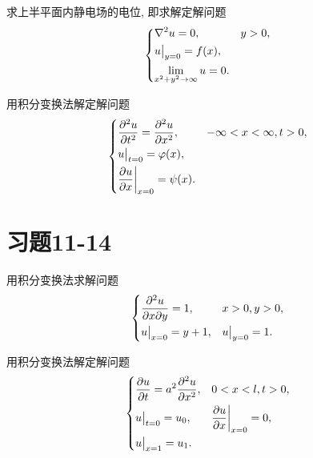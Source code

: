 \begin{yyEx}
	求上半平面内静电场的电位, 即求解定解问题
	\begin{equation*}
		\begin{dcases}
			\nabla^2u = 0,&y>0,\\
			u\big|_{y = 0} = f(x),&~\\
			\lim\limits_{x^2+y^2\to\infty}u = 0.&~
		\end{dcases}
	\end{equation*}
\end{yyEx}

\begin{yyEx}
	用积分变换法解定解问题
	\begin{equation*}
		\begin{dcases}
			\frac{\partial^2 u}{\partial t^2} = \frac{\partial^2 u}{\partial x^2}, &-\infty<x<\infty,t>0,\\
			u\big|_{t = 0} = \varphi(x),&~\\
			\frac{\partial u}{\partial x}\bigg|_{x = 0} = \psi(x).&~
		\end{dcases}
	\end{equation*}
\end{yyEx}

\section{习题11-14}

\begin{yyEx}
	用积分变换法求解问题
	\begin{equation*}
	\begin{dcases}
	\frac{\partial^2 u}{\partial x\partial y} = 1, &x>0,y>0,\\
	u\big|_{x = 0} = y+1,&u\big|_{y = 0} = 1.
	\end{dcases}
	\end{equation*}
\end{yyEx}

\begin{yyEx}
	用积分变换法解定解问题
	\begin{equation*}
	\begin{dcases}
	\frac{\partial u}{\partial t} = a^2\frac{\partial^2 u}{\partial x^2}, &0<x<l,t>0,\\
	u\big|_{t = 0} = u_0,&\frac{\partial u}{\partial x}\bigg|_{x = 0} = 0,\\
	u\big|_{x = 1} = u_1.&~
	\end{dcases}
	\end{equation*}
\end{yyEx}

